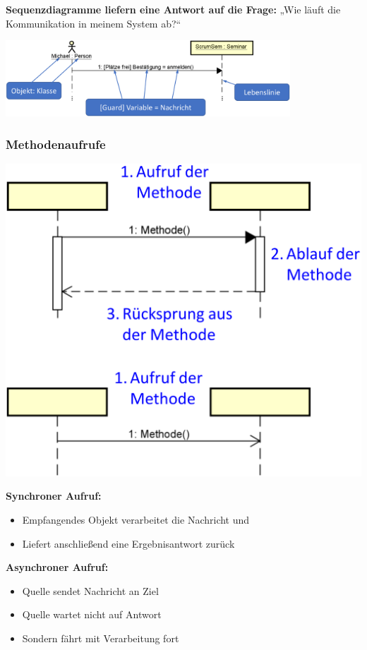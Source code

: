 \documentclass[11pt, a4paper]{article}
\begin{document}
\textbf{Sequenzdiagramme liefern eine Antwort auf die Frage:} „Wie läuft die Kommunikation in meinem System ab?“

\vspace{2em}

\centering \includegraphics[width=0.8\textwidth]{Sequenz-00.png}


\raggedright \subsubsection{Methodenaufrufe}

\vspace{1em}

\begin{minipage}[h]{0.4\textwidth}
    \raggedleft \includegraphics[width=1\textwidth]{Sequenz-02.png} 
\end{minipage}
\begin{minipage}[h]{0.55\textwidth}
    \tiny \textbf{Synchroner Aufruf:}
    \begin{itemize}
        \item Empfangendes Objekt verarbeitet die Nachricht und
        \item Liefert anschließend eine Ergebnisantwort zurück
    \end{itemize}
    \vspace{8em}
    \tiny \textbf{Asynchroner Aufruf:}
    \begin{itemize}
        \item Quelle sendet Nachricht an Ziel
        \item Quelle wartet nicht auf Antwort
        \item Sondern fährt mit Verarbeitung fort
    \end{itemize}    
\end{minipage}
\end{document}

